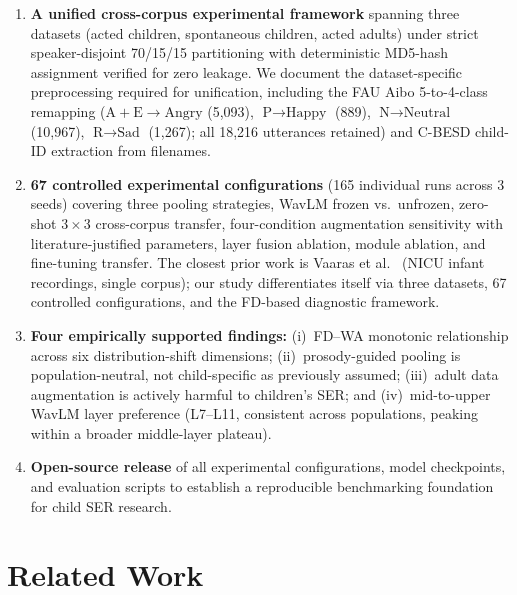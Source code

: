 \documentclass[11pt,a4paper]{article}
\begin{document}
\begin{enumerate}
\item \textbf{A unified cross-corpus experimental framework} spanning three
  datasets (acted children, spontaneous children, acted adults) under strict
  speaker-disjoint 70/15/15 partitioning with deterministic MD5-hash assignment
  verified for zero leakage. We document the dataset-specific preprocessing
  required for unification, including the FAU Aibo 5-to-4-class remapping
  ($\text{A}+\text{E} \rightarrow \text{Angry}$ (5,093),
  $\text{P} \rightarrow \text{Happy}$ (889),
  $\text{N} \rightarrow \text{Neutral}$ (10,967),
  $\text{R} \rightarrow \text{Sad}$ (1,267); all 18,216 utterances retained) and
  C-BESD child-ID extraction from filenames.

\item \textbf{67 controlled experimental configurations} (165 individual runs
  across 3 seeds) covering three pooling strategies, WavLM frozen vs.\
  unfrozen, zero-shot $3\times3$ cross-corpus transfer, four-condition
  augmentation sensitivity with literature-justified parameters, layer fusion
  ablation, module ablation, and fine-tuning transfer. The closest prior work
  is Vaaras et al.~\cite{vaaras2023speech} (NICU infant recordings, single
  corpus); our study differentiates itself via three datasets, 67 controlled
  configurations, and the FD-based diagnostic framework.

\item \textbf{Four empirically supported findings:} (i)~FD--WA monotonic
  relationship across six distribution-shift dimensions; (ii)~prosody-guided
  pooling is population-neutral, not child-specific as previously assumed;
  (iii)~adult data augmentation is actively harmful to children's SER; and
  (iv)~mid-to-upper WavLM layer preference (L7--L11, consistent across
  populations, peaking within a broader middle-layer plateau).

\item \textbf{Open-source release} of all experimental configurations, model
  checkpoints, and evaluation scripts to establish a reproducible benchmarking
  foundation for child SER research.
\end{enumerate}


\section{Related Work}
\label{sec:related_work}
\end{document}
